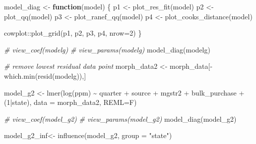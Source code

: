 \documentclass[
  11pt,
]{article}
\newenvironment{Shaded}{\begin{snugshade}}{\end{snugshade}}
\newcommand{\AttributeTok}[1]{\textcolor[rgb]{0.77,0.63,0.00}{#1}}
\newcommand{\CommentTok}[1]{\textcolor[rgb]{0.56,0.35,0.01}{\textit{#1}}}
\newcommand{\ControlFlowTok}[1]{\textcolor[rgb]{0.13,0.29,0.53}{\textbf{#1}}}
\newcommand{\DecValTok}[1]{\textcolor[rgb]{0.00,0.00,0.81}{#1}}
\newcommand{\FunctionTok}[1]{\textcolor[rgb]{0.00,0.00,0.00}{#1}}
\newcommand{\NormalTok}[1]{#1}
\newcommand{\OtherTok}[1]{\textcolor[rgb]{0.56,0.35,0.01}{#1}}
\newcommand{\SpecialCharTok}[1]{\textcolor[rgb]{0.00,0.00,0.00}{#1}}
\newcommand{\StringTok}[1]{\textcolor[rgb]{0.31,0.60,0.02}{#1}}
\begin{document}
\begin{Shaded}
\begin{Highlighting}[]
\NormalTok{model\_diag }\OtherTok{\textless{}{-}} \ControlFlowTok{function}\NormalTok{(model) \{}
\NormalTok{  p1 }\OtherTok{\textless{}{-}} \FunctionTok{plot\_res\_fit}\NormalTok{(model)}
\NormalTok{  p2 }\OtherTok{\textless{}{-}} \FunctionTok{plot\_qq}\NormalTok{(model)}
\NormalTok{  p3 }\OtherTok{\textless{}{-}} \FunctionTok{plot\_ranef\_qq}\NormalTok{(model)}
\NormalTok{  p4 }\OtherTok{\textless{}{-}} \FunctionTok{plot\_cooks\_distance}\NormalTok{(model)}

\NormalTok{  cowplot}\SpecialCharTok{::}\FunctionTok{plot\_grid}\NormalTok{(p1, p2, p3, p4, }\AttributeTok{nrow=}\DecValTok{2}\NormalTok{)}
\NormalTok{\}}
\end{Highlighting}
\end{Shaded}

\begin{Shaded}
\begin{Highlighting}[]
\CommentTok{\# view\_coef(modelg)}
\CommentTok{\# view\_params(modelg)}
\FunctionTok{model\_diag}\NormalTok{(modelg)}
\end{Highlighting}
\end{Shaded}

\begin{Shaded}
\begin{Highlighting}[]
\CommentTok{\# remove lowest residual data point}
\NormalTok{morph\_data2 }\OtherTok{\textless{}{-}}\NormalTok{ morph\_data[}\SpecialCharTok{{-}}\FunctionTok{which.min}\NormalTok{(}\FunctionTok{resid}\NormalTok{(modelg)),]}


\NormalTok{model\_g2 }\OtherTok{\textless{}{-}} \FunctionTok{lmer}\NormalTok{(}\FunctionTok{log}\NormalTok{(ppm) }\SpecialCharTok{\textasciitilde{}}\NormalTok{  quarter }\SpecialCharTok{+}\NormalTok{ source }\SpecialCharTok{+}\NormalTok{ mgstr2 }\SpecialCharTok{+}\NormalTok{ bulk\_purchase }\SpecialCharTok{+}\NormalTok{ (}\DecValTok{1}\SpecialCharTok{|}\NormalTok{state), }\AttributeTok{data =}\NormalTok{ morph\_data2, }\AttributeTok{REML=}\NormalTok{F)}


\CommentTok{\# view\_coef(model\_g2)}
\CommentTok{\# view\_params(model\_g2)}
\FunctionTok{model\_diag}\NormalTok{(model\_g2)}
\end{Highlighting}
\end{Shaded}

\begin{Shaded}
\begin{Highlighting}[]
\NormalTok{model\_g2\_inf}\OtherTok{\textless{}{-}} \FunctionTok{influence}\NormalTok{(model\_g2, }\AttributeTok{group =} \StringTok{"state"}\NormalTok{)}
\end{Highlighting}
\end{Shaded}
\end{document}
